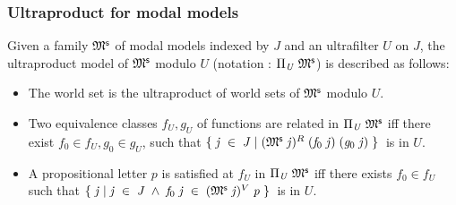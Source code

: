 \documentclass{llncs}
\renewcommand{\HOLinline}[1]{\ensuremath{#1}}
\renewcommand{\HOLTokenBar}{\mbox{$|$}}
\begin{document}
\subsubsection{Ultraproduct for modal models}
Given a family \HOLinline{\HOLFreeVar{\ensuremath{\mathfrak{M}\sp{\sf s}}}} of modal models indexed by $J$ and an ultrafilter $U$ on $J$, the ultraproduct model of \HOLinline{\HOLFreeVar{\ensuremath{\mathfrak{M}\sp{\sf s}}}} modulo $U$ (notation : \HOLinline{\Pi\sb{\HOLFreeVar{U}}\;\HOLFreeVar{\ensuremath{\mathfrak{M}\sp{\sf s}}}}) is described as follows:

\begin{itemize}
  \item The world set is the ultraproduct of world sets of \HOLinline{\HOLFreeVar{\ensuremath{\mathfrak{M}\sp{\sf s}}}} modulo $U$. 

  \item Two equivalence classes $f_U,g_U$ of functions are related in \HOLinline{\Pi\sb{\HOLFreeVar{U}}\;\HOLFreeVar{\ensuremath{\mathfrak{M}\sp{\sf s}}}} iff there exist $f_0\in f_U,g_0\in g_U$, such that \HOLinline{\HOLTokenLeftbrace{}\HOLBoundVar{j}\;\HOLSymConst{\HOLTokenIn{}}\;\HOLFreeVar{J}\;\HOLTokenBar{}\;(\HOLFreeVar{\ensuremath{\mathfrak{M}\sp{\sf s}}}\;\HOLBoundVar{j})\HOLSymConst{\ensuremath{\sp{R}}}\;(\HOLFreeVar{f}\sb{\mathrm{0}}\;\HOLBoundVar{j})\;(\HOLFreeVar{g}\sb{\mathrm{0}}\;\HOLBoundVar{j})\HOLTokenRightbrace{}} is in $U$.
  \item A propositional letter $p$ is satisfied at $f_U$ in \HOLinline{\Pi\sb{\HOLFreeVar{U}}\;\HOLFreeVar{\ensuremath{\mathfrak{M}\sp{\sf s}}}} iff there exists $f_0\in f_U$ such that \HOLinline{\HOLTokenLeftbrace{}\HOLBoundVar{j}\;\HOLTokenBar{}\;\HOLBoundVar{j}\;\HOLSymConst{\HOLTokenIn{}}\;\HOLFreeVar{J}\;\HOLSymConst{\HOLTokenConj{}}\;\HOLFreeVar{f}\sb{\mathrm{0}}\;\HOLBoundVar{j}\;\HOLSymConst{\HOLTokenIn{}}\;(\HOLFreeVar{\ensuremath{\mathfrak{M}\sp{\sf s}}}\;\HOLBoundVar{j})\HOLSymConst{\ensuremath{\sp{V}}}\;\HOLFreeVar{p}\HOLTokenRightbrace{}} is in $U$.
\end{itemize}
\end{document}
